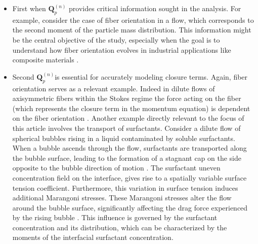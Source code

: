 \begin{itemize}
\item First when $\textbf{Q}_p^{(n)}$ provides critical information sought in the analysis. 
For example, consider the case of fiber orientation in a flow, which corresponds to the second moment of the particle mass distribution. 
This information might be the central objective of the study, especially when the goal is to understand how fiber orientation evolves in industrial applications like composite materials \citep{advani1987use}.

\item Second $\textbf{Q}_p^{(n)}$is essential for accurately modeling closure terms. 
Again, fiber orientation serves as a relevant example. 
Indeed in dilute flows of axisymmetric fibers within the Stokes regime the force acting on the fiber (which represents the closure term in the momentum equation) is dependent on the fiber orientation \citep{kim2013microhydrodynamics}. %
Another example directly relevant to the focus of this article involves the transport of surfactants. 
Consider a dilute flow of spherical bubbles rising in a liquid contaminated by soluble surfactants. 
When a bubble ascends through the flow, surfactants are transported along the bubble surface, leading to the formation of a stagnant cap on the side opposite to the bubble direction of motion \citep{cuenot1997effects}.
The surfactant uneven concentration field on the interface, gives rise to a spatially variable surface tension coefficient. 
Furthermore, this variation in surface tension induces additional Marangoni stresses. %
These Marangoni stresses alter the flow around the bubble surface, significantly affecting the drag force experienced by the rising bubble \citep{cuenot1997effects,pesci2018computational}. 
This influence is governed by the surfactant concentration and its distribution, which can be characterized by the moments of the interfacial surfactant concentration.



\end{itemize}
